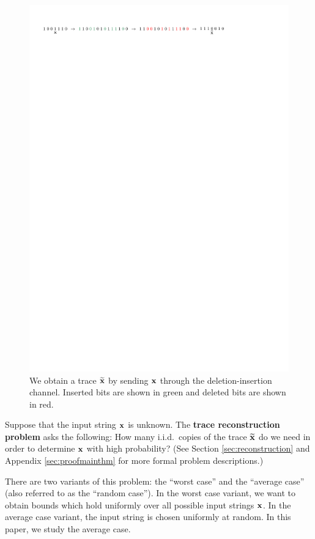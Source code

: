 \documentclass[final,12pt]{colt2018} %
\newcommand{\1}{\mathbf{1}}
\newcommand{\wt}{\widetilde}
\def\xt{{\wt {\bf x}}}
\def\x{{\bf x}}
\begin{document}
\begin{figure}[ht!]
	\centering
	\includegraphics[scale=1]{insertion-deletion2}
	\caption{We obtain a trace $\xt$ by sending $\x$ through the deletion-insertion channel. Inserted bits are shown in green and deleted bits are shown in red.}
	\label{fig:trace}
\end{figure}


Suppose that the input string $\x$ is unknown. The {\bf trace reconstruction problem} asks
the following: How many i.i.d.\ copies of the trace $\xt$ do we
need in order to determine $\x$ with high probability? (See Section \ref{sec:reconstruction} and Appendix \ref{sec:proofmainthm} for more formal problem descriptions.)

There are two variants of this problem: the ``worst case'' and the ``average case'' (also referred to as the ``random case''). In the worst case variant, we want to obtain bounds which hold uniformly over all possible input strings $\x$. In the average case variant, the input string is chosen uniformly at random. In this paper, we study the average case.
\end{document}
